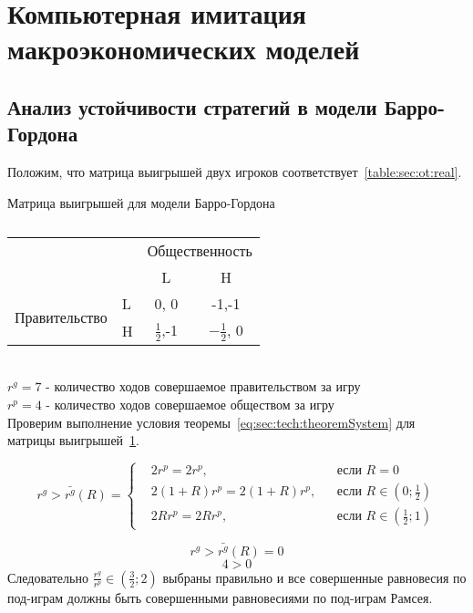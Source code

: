 \section{Компьютерная имитация макроэкономических моделей} 

\subsection{Анализ устойчивости стратегий в модели Барро-Гордона}
Положим, что матрица выигрышей двух игроков соответствует~\ref{table:sec:ot:real}.\\
\begin{table}[h]
	\centering
	
	\caption{}	
			\footnotesize Матрица выигрышей для модели Барро-Гордона\\
			\normalsize
			
\begin{tabular}{|l|l|c|c|}
	\hline
	\multicolumn{2}{|l|}{\multirow{2}{*}{}} & \multicolumn{2}{l|}{Общественность} \\ \cline{3-4} 
	\multicolumn{2}{|l|}{}                  & L                & H                \\ \hline
	\multirow{2}{*}{Правительство}    & L   & 0, 0             & -1,-1            \\ \cline{2-4} 
	& H   & $\frac{1}{2}$,-1             & $-\frac{1}{2}$, 0            \\ \hline
\end{tabular}

	\label{table:sec:ot:real1}
\end{table}\\
$r^g= 7 $ - количество ходов совершаемое  правительством за игру\\
$r^p= 4 $ - количество ходов совершаемое  обществом за игру\\
Проверим выполнение условия теоремы~\ref{eq:sec:tech:theoremSystem} для матрицы выигрышей~\ref{table:sec:ot:real1}. 

$$
r^g> \bar{r^g}(R) = \left\{ 
\begin{aligned} 
&2r^p= 2r^p, &&\text{если } R=0
\\
&2(1+R)r^p= 2(1+R)r^p, &&\text{если } 	R\in\left(0; \frac{1}{2}\right)
\\
&2Rr^p= 2Rr^p, &&\text{если } 	R\in\left( \frac{1}{2};1\right)
\end{aligned}
\right.		
$$

$$
r^g> \bar{r^g}(R) = 0$$
$$
4 > 0
$$
Следовательно $\frac{r^g}{r^p} \in \left(\frac{3}{2};2\right)$ выбраны правильно и все совершенные равновесия по под-играм должны быть совершенными равновесиями по под-играм Рамсея. \\
 
